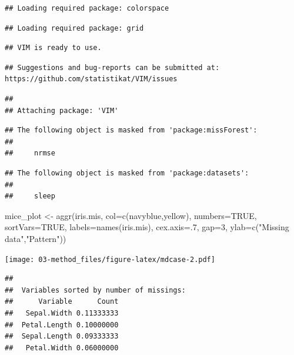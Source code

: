 \documentclass[
]{book}
\newenvironment{Shaded}{\begin{snugshade}}{\end{snugshade}}
\newcommand{\AttributeTok}[1]{\textcolor[rgb]{0.77,0.63,0.00}{#1}}
\newcommand{\ConstantTok}[1]{\textcolor[rgb]{0.00,0.00,0.00}{#1}}
\newcommand{\DecValTok}[1]{\textcolor[rgb]{0.00,0.00,0.81}{#1}}
\newcommand{\FunctionTok}[1]{\textcolor[rgb]{0.00,0.00,0.00}{#1}}
\newcommand{\NormalTok}[1]{#1}
\newcommand{\OtherTok}[1]{\textcolor[rgb]{0.56,0.35,0.01}{#1}}
\newcommand{\StringTok}[1]{\textcolor[rgb]{0.31,0.60,0.02}{#1}}
\begin{document}
\begin{verbatim}
## Loading required package: colorspace
\end{verbatim}

\begin{verbatim}
## Loading required package: grid
\end{verbatim}

\begin{verbatim}
## VIM is ready to use.
\end{verbatim}

\begin{verbatim}
## Suggestions and bug-reports can be submitted at: https://github.com/statistikat/VIM/issues
\end{verbatim}

\begin{verbatim}
## 
## Attaching package: 'VIM'
\end{verbatim}

\begin{verbatim}
## The following object is masked from 'package:missForest':
## 
##     nrmse
\end{verbatim}

\begin{verbatim}
## The following object is masked from 'package:datasets':
## 
##     sleep
\end{verbatim}

\begin{Shaded}
\begin{Highlighting}[]
\NormalTok{mice\_plot }\OtherTok{\textless{}{-}} \FunctionTok{aggr}\NormalTok{(iris.mis, }\AttributeTok{col=}\FunctionTok{c}\NormalTok{(}\StringTok{\textquotesingle{}navyblue\textquotesingle{}}\NormalTok{,}\StringTok{\textquotesingle{}yellow\textquotesingle{}}\NormalTok{),}
\AttributeTok{numbers=}\ConstantTok{TRUE}\NormalTok{, }\AttributeTok{sortVars=}\ConstantTok{TRUE}\NormalTok{,}
\AttributeTok{labels=}\FunctionTok{names}\NormalTok{(iris.mis), }\AttributeTok{cex.axis=}\NormalTok{.}\DecValTok{7}\NormalTok{,}
\AttributeTok{gap=}\DecValTok{3}\NormalTok{, }\AttributeTok{ylab=}\FunctionTok{c}\NormalTok{(}\StringTok{"Missing data"}\NormalTok{,}\StringTok{"Pattern"}\NormalTok{))}
\end{Highlighting}
\end{Shaded}

\texttt{[image: 03-method\_files/figure-latex/mdcase-2.pdf]}

\begin{verbatim}
## 
##  Variables sorted by number of missings: 
##      Variable      Count
##   Sepal.Width 0.11333333
##  Petal.Length 0.10000000
##  Sepal.Length 0.09333333
##   Petal.Width 0.06000000
\end{verbatim}
\end{document}

